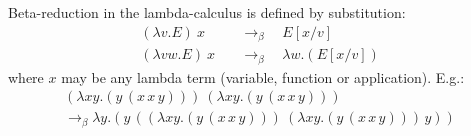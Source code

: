 \documentclass[a4paper,12pt]{article}
\begin{document}
\noindent Beta-reduction in the lambda-calculus is defined by substitution:
\begin{align}
	(\lambda v.E)\ x &\quad\longrightarrow_{\beta}\quad E[x/v]\\
	(\lambda vw.E)\ x &\quad\longrightarrow_{\beta}\quad \lambda w.(E[x/v])
\end{align}
where $x$ may be any lambda term (variable, function or application).  E.g.:
\begin{multline}
	(\lambda xy.(y\,(x\,x\,y)))\:(\lambda xy.(y\,(x\,x\,y)))\\
	\longrightarrow_{\beta} \lambda y.(y\,((\lambda xy.(y\,(x\,x\,y)))\:(\lambda xy.(y\,(x\,x\,y)))\, y))
\end{multline}
\end{document}
